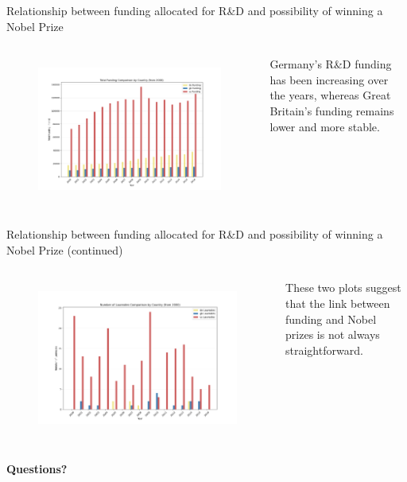 \documentclass[aspectratio=169,xcolor=dvipsnames]{beamer}
\begin{document}
\begin{frame}{Relationship between funding allocated for R\&D and possibility of winning a Nobel Prize}
	\begin{columns}[c]
		\begin{figure}[H]
			\centering
			\includegraphics[width=\textwidth]{../queries/plots/funding_comparison_by_country.png}
			\label{fig:fundings_per_country}
		\end{figure}
		Germany's R\&D funding has been increasing over the years, whereas
		Great Britain's funding remains lower and more stable.
	\end{columns}
\end{frame}

\begin{frame}{Relationship between funding allocated for R\&D and possibility of winning a Nobel Prize (continued)}
	\begin{columns}[c]
		\begin{figure}[H]
			\centering
			\includegraphics[width=\textwidth]{../queries/plots/laureates_comparison_by_country.png}
			\label{fig:laureates_per_country}
		\end{figure}
		These two plots suggest that the link between funding and Nobel prizes is not always
		straightforward.
	\end{columns}
\end{frame}

\begin{frame}
	\Huge{\centerline{\textbf{Questions?}}}
\end{frame}
\end{document}
